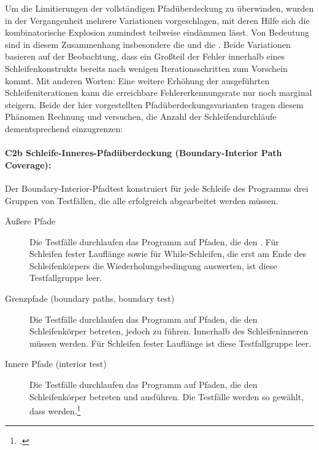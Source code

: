 \documentclass{lehramt-informatik-haupt}
\begin{document}
Um die Limitierungen der vollständigen Pfadüberdeckung zu überwinden,
wurden in der Vergangenheit mehrere Variationen vorgeschlagen, mit deren
Hilfe sich die kombinatorische Explosion zumindest teilweise eindämmen
lässt. Von Bedeutung sind in diesem Zusammenhang insbesondere die
 und die . Beide Variationen basieren auf der Beobachtung, dass
ein Großteil der Fehler innerhalb eines Schleifenkonstrukts bereits nach
wenigen Iterationsschritten zum Vorschein kommt. Mit anderen Worten:
Eine weitere Erhöhung der ausgeführten Schleifeniterationen kann die
erreichbare Fehlererkennungsrate nur noch marginal steigern. Beide der
hier vorgestellten Pfadüberdeckungsvarianten tragen diesem Phänomen
Rechnung und versuchen, die Anzahl der Schleifendurchläufe
dementsprechend einzugrenzen:

%

\paragraph{C2b Schleife-Inneres-Pfadüberdeckung (Boundary-Interior Path Coverage):}

\noindent
Der Boundary-Interior-Pfadtest konstruiert für jede Schleife des
Programms drei Gruppen von Testfällen, die alle erfolgreich abgearbeitet
werden müssen.

\begin{description}
\item[Äußere Pfade]
Die Testfälle durchlaufen das Programm auf Pfaden, die den
. Für Schleifen fester Lauflänge
sowie für While-Schleifen, die erst am Ende des Schleifenkörpers die
Wiederholungsbedingung auswerten, ist diese Testfallgruppe leer.

\item[Grenzpfade (boundary paths, boundary test)] Die Testfälle
durchlaufen das Programm auf Pfaden, die den Schleifenkörper betreten,
jedoch zu  führen. Innerhalb des
Schleifeninneren müssen  werden.
Für Schleifen fester Lauflänge ist diese Testfallgruppe leer.

\item[Innere Pfade (interior test)] Die Testfälle durchlaufen das
Programm auf Pfaden, die den Schleifenkörper betreten und
 ausführen. Die Testfälle
werden so gewählt, dass  werden.\footcite[Seite 212]{hoffmann:software}
\end{description}
\end{document}

